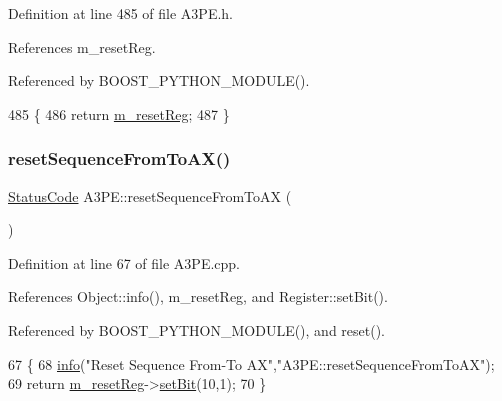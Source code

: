 Definition at line 485 of file A3\+P\+E.\+h.



References m\+\_\+reset\+Reg.



Referenced by B\+O\+O\+S\+T\+\_\+\+P\+Y\+T\+H\+O\+N\+\_\+\+M\+O\+D\+U\+L\+E().


\begin{DoxyCode}
485                       \{
486     \textcolor{keywordflow}{return} \hyperlink{classA3PE_ab4db5f00976e5095686f108c8febf702}{m\_resetReg};
487   \}
\end{DoxyCode}
\mbox{\label{classA3PE_a6015ba83a7b828efb1969291ab740eee}} 
\subsubsection{\texorpdfstring{reset\+Sequence\+From\+To\+A\+X()}{resetSequenceFromToAX()}}
{\footnotesize\ttfamily \hyperlink{classStatusCode}{Status\+Code} A3\+P\+E\+::reset\+Sequence\+From\+To\+AX (\begin{DoxyParamCaption}{ }\end{DoxyParamCaption})}



Definition at line 67 of file A3\+P\+E.\+cpp.



References Object\+::info(), m\+\_\+reset\+Reg, and Register\+::set\+Bit().



Referenced by B\+O\+O\+S\+T\+\_\+\+P\+Y\+T\+H\+O\+N\+\_\+\+M\+O\+D\+U\+L\+E(), and reset().


\begin{DoxyCode}
67                                       \{
68   \hyperlink{classObject_a644fd329ea4cb85f54fa6846484b84a8}{info}(\textcolor{stringliteral}{"Reset Sequence From-To AX"},\textcolor{stringliteral}{"A3PE::resetSequenceFromToAX"});
69   \textcolor{keywordflow}{return} \hyperlink{classA3PE_ab4db5f00976e5095686f108c8febf702}{m\_resetReg}->\hyperlink{classRegister_ab094246dd12aa7e0aa0ca917f4e70b31}{setBit}(10,1);
70 \}
\end{DoxyCode}
\mbox{\label{classA3PE_ae164123b49f8c4d1d119dbf201f0a839}} 
